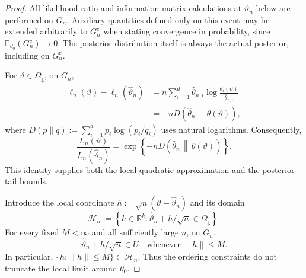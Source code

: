 \documentclass{article}
\theoremstyle{named}
\theoremstyle{named1}
\theoremstyle{plain}
\theoremstyle{remark}
\begin{document}
\begin{proof}
All likelihood-ratio and information-matrix calculations at
$\widehat\vartheta_n$ below are performed on $G_n$. Auxiliary quantities
defined only on this event may be extended arbitrarily to $G_n^c$ when
stating convergence in probability, since
$\mathbb P_{\theta_0}(G_n^c)\to0$. The posterior distribution itself is
always the actual posterior, including on $G_n^c$.

For $\vartheta\in\Omega_{\downarrow}$, on $G_n$,
\[
\begin{aligned}
    \ell_n(\vartheta)-\ell_n(\widehat\vartheta_n)
    &=
    n\sum_{i=1}^d\widehat\theta_{n,i}
    \log\frac{\theta_i(\vartheta)}{\widehat\theta_{n,i}}\\
    &=-nD\!\left(
        \widehat\theta_n\,\middle\|\,\theta(\vartheta)
    \right),
\end{aligned}
\]
where $D(p\|q):=\sum_{i=1}^dp_i\log(p_i/q_i)$ uses natural logarithms.
Consequently,
\begin{equation}
    \frac{L_n(\vartheta)}{L_n(\widehat\vartheta_n)}
    =
    \exp\left\{
        -nD\!\left(
            \widehat\theta_n\,\middle\|\,\theta(\vartheta)
        \right)
    \right\}.
    \label{eq:likelihood-kl}
\end{equation}
This identity supplies both the local quadratic approximation and the
posterior tail bounds.

Introduce the local coordinate
$h:=\sqrt n(\vartheta-\widehat\vartheta_n)$ and its domain
\[
    \mathcal H_n
    :=
    \left\{
        h\in\mathbb R^k:
        \widehat\vartheta_n+h/\sqrt n\in\Omega_{\downarrow}
    \right\}.
\]
For every fixed $M<\infty$ and all sufficiently large $n$, on $G_n$,
\[
    \widehat\vartheta_n+h/\sqrt n\in U
    \quad\text{whenever }\|h\|\leq M.
\]
In particular, $\{h:\|h\|\leq M\}\subset\mathcal H_n$. Thus the
ordering constraints do not truncate the local limit around $\theta_0$.


\end{proof}
\end{document}
